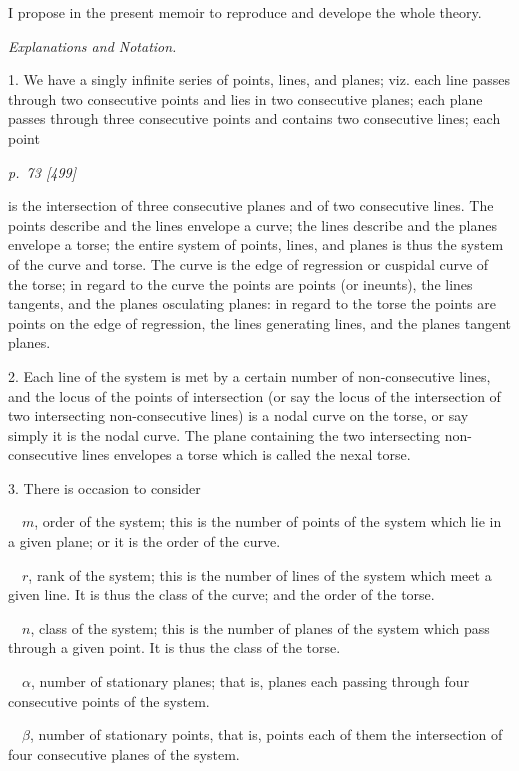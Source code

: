 \documentclass[11pt,a4paper]{article}
\newcommand{\pagemarker}[2]{\clearpage\noindent\textit{p.~#1 [#2]}\par\medskip}
\begin{document}
I propose in the present memoir to reproduce and develope the whole theory.

\begin{center}\textit{Explanations and Notation.}\end{center}

1. We have a singly infinite series of points, lines, and planes; viz. each line passes
through two consecutive points and lies in two consecutive planes; each plane passes
through three consecutive points and contains two consecutive lines; each point

\pagemarker{73}{499}
is the intersection of three consecutive planes and of two consecutive lines. The
points describe and the lines envelope a curve; the lines describe and the planes
envelope a torse; the entire system of points, lines, and planes is thus the system of
the curve and torse. The curve is the edge of regression or cuspidal curve of the
torse; in regard to the curve the points are points (or ineunts), the lines tangents,
and the planes osculating planes: in regard to the torse the points are points on the
edge of regression, the lines generating lines, and the planes tangent planes.

2. Each line of the system is met by a certain number of non-consecutive lines, and
the locus of the points of intersection (or say the locus of the intersection of two
intersecting non-consecutive lines) is a nodal curve on the torse, or say simply it is
the nodal curve. The plane containing the two intersecting non-consecutive lines
envelopes a torse which is called the nexal torse.

3. There is occasion to consider

\(\quad m\), order of the system; this is the number of points of the system which
lie in a given plane; or it is the order of the curve.

\(\quad r\), rank of the system; this is the number of lines of the system which
meet a given line. It is thus the class of the curve; and the order of the torse.

\(\quad n\), class of the system; this is the number of planes of the system which
pass through a given point. It is thus the class of the torse.

\(\quad \alpha\), number of stationary planes; that is, planes each passing through
four consecutive points of the system.

\(\quad \beta\), number of stationary points, that is, points each of them the
intersection of four consecutive planes of the system.
\end{document}
